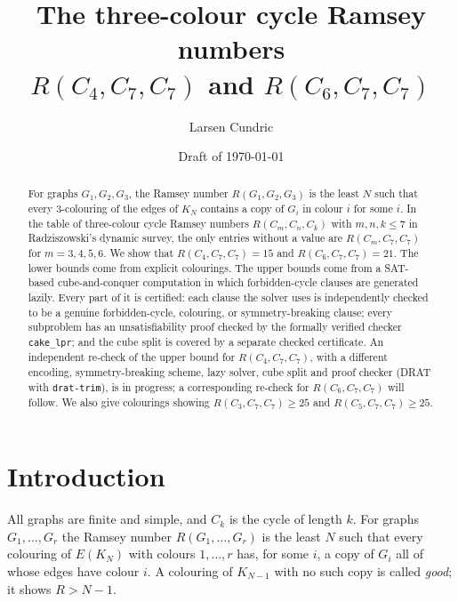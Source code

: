 \documentclass[11pt]{amsart}
\title[The cycle Ramsey numbers $R(C_4,C_7,C_7)$ and $R(C_6,C_7,C_7)$]{The three-colour cycle Ramsey numbers\\ $R(C_4,C_7,C_7)$ and $R(C_6,C_7,C_7)$}
\author{Larsen Cundric}
\date{Draft of \today}
\theoremstyle{definition}
\theoremstyle{remark}
\begin{document}
\begin{abstract}
For graphs $G_1,G_2,G_3$, the Ramsey number $R(G_1,G_2,G_3)$ is the least $N$ such that every $3$-colouring of the edges of
$K_N$ contains a copy of $G_i$ in colour $i$ for some $i$. In the table of three-colour cycle Ramsey numbers
$R(C_m,C_n,C_k)$ with $m,n,k\le 7$ in Radziszowski's dynamic survey, the only entries without a value are
$R(C_m,C_7,C_7)$ for $m=3,4,5,6$. We show that $R(C_4,C_7,C_7)=15$ and $R(C_6,C_7,C_7)=21$.
The lower bounds come from explicit colourings. The upper bounds come from a SAT-based cube-and-conquer
computation in which forbidden-cycle clauses are generated lazily. Every part of it is certified: each clause the solver uses
is independently checked to be a genuine forbidden-cycle, colouring, or symmetry-breaking clause; every subproblem has an
unsatisfiability proof checked by the formally verified checker \texttt{cake\_lpr}; and the cube split is covered by a separate
checked certificate. An independent re-check of the upper bound for $R(C_4,C_7,C_7)$, with a different encoding,
symmetry-breaking scheme, lazy solver, cube split and proof checker (DRAT with \texttt{drat-trim}), is in progress; a
corresponding re-check for $R(C_6,C_7,C_7)$ will follow. We also give
colourings showing $R(C_3,C_7,C_7)\ge 25$ and $R(C_5,C_7,C_7)\ge 25$.
\end{abstract}

\maketitle

\section{Introduction}

All graphs are finite and simple, and $C_k$ is the cycle of length $k$. For graphs $G_1,\dots,G_r$ the Ramsey number
$R(G_1,\dots,G_r)$ is the least $N$ such that every colouring of $E(K_N)$ with colours $1,\dots,r$ has, for some $i$, a copy of
$G_i$ all of whose edges have colour $i$. A colouring of $K_{N-1}$ with no such copy is called \emph{good}; it shows $R>N-1$.
\end{document}

